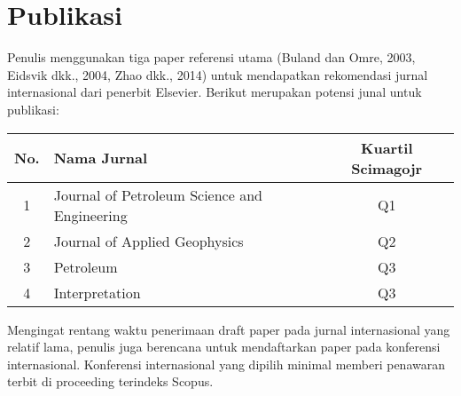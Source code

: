 \documentclass[main.tex]{subfiles}
\begin{document}
\section{Publikasi}
Penulis menggunakan tiga paper referensi utama (Buland dan Omre, 2003,
Eidsvik dkk., 2004, Zhao dkk., 2014) untuk mendapatkan rekomendasi jurnal
internasional dari penerbit Elsevier. Berikut merupakan potensi junal untuk
publikasi:

\begin{center}
    \begin{tabularx}{\linewidth}{c l c}
        \hline
        \textbf{No.} & \textbf{Nama Jurnal} & \textbf{Kuartil Scimagojr} \\
        \hline
        1 & Journal of Petroleum Science and Engineering & Q1 \\
        2 & Journal of Applied Geophysics & Q2 \\
        3 & Petroleum & Q3 \\
        4 & Interpretation & Q3 \\
        \hline
    \end{tabularx}
\end{center}

Mengingat rentang waktu penerimaan draft paper pada jurnal internasional yang
relatif lama, penulis juga berencana untuk mendaftarkan paper pada konferensi
internasional. Konferensi internasional yang dipilih minimal memberi penawaran
terbit di proceeding terindeks Scopus.
\end{document}
